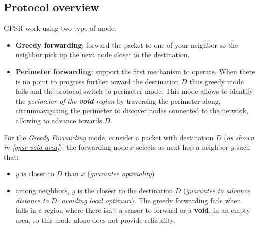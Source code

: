 \documentclass[10pt,a4paper]{report}
\theoremstyle{definition}
\begin{document}
\subsection{Protocol overview}\label{sec:overview}
GPSR work using two type of mode:
\begin{itemize}
	\item 
	\textbf{Greedy forwarding}: forward the packet to one of your neighbor so the neighbor pick up the next node closer to the destination.
	\item 
	\textbf{Perimeter forwarding}: support the first mechanism to operate. When there is no point to progress further toward the destination $D$ thus greedy mode fails and the protocol switch to perimeter mode. This mode allows to identify the \textit{perimeter of the \textbf{void} region} by traversing the perimeter along, circumnavigating the perimeter to discover nodes connected to the network, allowing to advance towards $D$.
\end{itemize}

For the \textit{Greedy Forwarding} mode, consider a packet with destination $D$ (\textit{as shown in \ref{gpsr-void-area}}): the forwarding node $x$ selects as next hop a neighbor $y$ such that:
\begin{itemize}
	\item 
	$y$ is closer to $D$ than $x$ (\textit{guarantee optimality})
	\item 
	among neighbors, $y$ is the closest to the destination $D$ (\textit{guarantee to advance distance to $D$, avoiding local optimum}).
	The greedy forwarding fails when falls in a region where there isn't a sensor to forward or a \textbf{void}, in an empty area, so this mode alone does not provide reliability.
\end{itemize}
\end{document}
